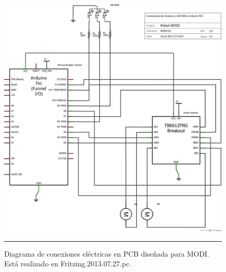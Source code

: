 \begin{figure}[htbp]
	\centering
\includegraphics[width=\textwidth]{./Figures/MODI/MODI_schem.png}
		\rule{35em}{0.5pt}
	\caption[Diagrama eléctrico de conexiones en PCB MODI]{Diagrama de conexiones eléctricas en PCB diseñada para MODI. Está realizado en Fritzing.2013.07.27.pc.}
	\label{fig:Historia}
\end{figure}
